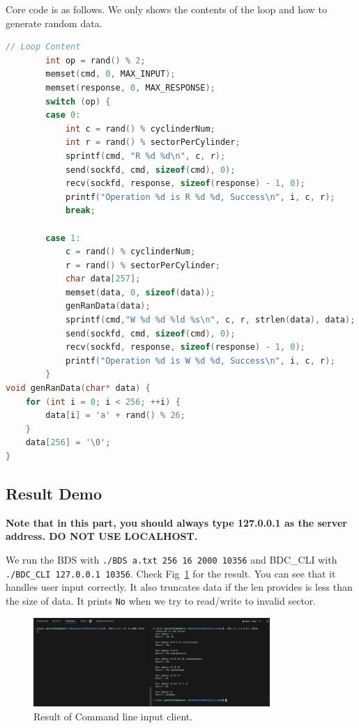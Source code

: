 Core code is as follows. We only shows the contents of the loop and how to generate random data.

\begin{lstlisting}[language=C]
    // Loop Content
        int op = rand() % 2;
        memset(cmd, 0, MAX_INPUT);
        memset(response, 0, MAX_RESPONSE);
        switch (op) {
        case 0:
            int c = rand() % cyclinderNum;
            int r = rand() % sectorPerCylinder;
            sprintf(cmd, "R %d %d\n", c, r);
            send(sockfd, cmd, sizeof(cmd), 0);
            recv(sockfd, response, sizeof(response) - 1, 0);
            printf("Operation %d is R %d %d, Success\n", i, c, r);
            break;

        case 1:
            c = rand() % cyclinderNum;
            r = rand() % sectorPerCylinder;
            char data[257];
            memset(data, 0, sizeof(data));
            genRanData(data);
            sprintf(cmd,"W %d %d %ld %s\n", c, r, strlen(data), data);
            send(sockfd, cmd, sizeof(cmd), 0);
            recv(sockfd, response, sizeof(response) - 1, 0);
            printf("Operation %d is W %d %d, Success\n", i, c, r);
        }
void genRanData(char* data) {
    for (int i = 0; i < 256; ++i) {
        data[i] = 'a' + rand() % 26;
    }                
    data[256] = '\0'; 
}

\end{lstlisting}

\subsection{Result Demo}
\textbf{Note that in this part, you should always type 127.0.0.1 as the server address. DO NOT USE LOCALHOST.}

We run the BDS with \texttt{./BDS a.txt 256 16 2000 10356} and BDC\_CLI with 
\texttt{./BDC\_CLI 127.0.0.1 10356}. Check Fig~\ref{fig:cli} for the result. You can see that it handles user input correctly.
It also truncates data if the len provides is less than the size of data. It prints \texttt{No} when we try to read/write to invalid sector.

\begin{figure}[!h]
    \centering
    \includegraphics[width=0.8\textwidth]{fig/bdc_cli.png}
    \caption{Result of Command line input client.}
    \label{fig:cli}
\end{figure}


